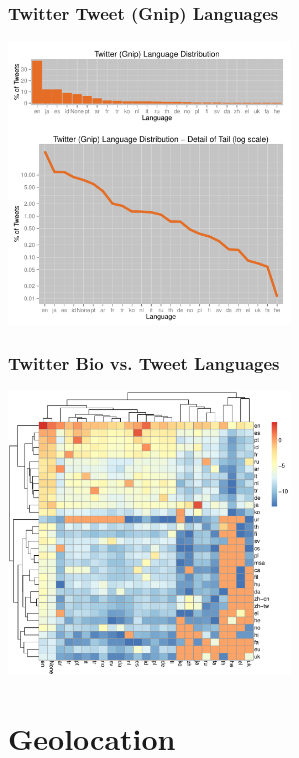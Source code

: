 \documentclass{beamer}
\begin{document}

\begin{frame}\frametitle{Twitter Tweet (Gnip) Languages}
  \begin{center}
    \includegraphics[width=7.5cm]{./imgs/distro_gnip.pdf}
  \end{center}
\end{frame}


\begin{frame}\frametitle{Twitter Bio vs. Tweet Languages}
  \begin{center}
    \includegraphics[width=7.5cm]{./imgs/heatmap.pdf}
  \end{center}
\end{frame}


\section{Geolocation}
\end{document}
